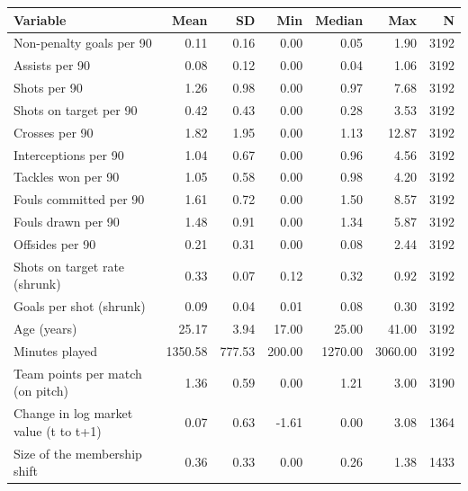 \begin{tabular}{lrrrrrr}
\toprule
Variable & Mean & SD & Min & Median & Max & N \\
\midrule
Non-penalty goals per 90 & 0.11 & 0.16 & 0.00 & 0.05 & 1.90 & 3192 \\
Assists per 90 & 0.08 & 0.12 & 0.00 & 0.04 & 1.06 & 3192 \\
Shots per 90 & 1.26 & 0.98 & 0.00 & 0.97 & 7.68 & 3192 \\
Shots on target per 90 & 0.42 & 0.43 & 0.00 & 0.28 & 3.53 & 3192 \\
Crosses per 90 & 1.82 & 1.95 & 0.00 & 1.13 & 12.87 & 3192 \\
Interceptions per 90 & 1.04 & 0.67 & 0.00 & 0.96 & 4.56 & 3192 \\
Tackles won per 90 & 1.05 & 0.58 & 0.00 & 0.98 & 4.20 & 3192 \\
Fouls committed per 90 & 1.61 & 0.72 & 0.00 & 1.50 & 8.57 & 3192 \\
Fouls drawn per 90 & 1.48 & 0.91 & 0.00 & 1.34 & 5.87 & 3192 \\
Offsides per 90 & 0.21 & 0.31 & 0.00 & 0.08 & 2.44 & 3192 \\
Shots on target rate (shrunk) & 0.33 & 0.07 & 0.12 & 0.32 & 0.92 & 3192 \\
Goals per shot (shrunk) & 0.09 & 0.04 & 0.01 & 0.08 & 0.30 & 3192 \\
Age (years) & 25.17 & 3.94 & 17.00 & 25.00 & 41.00 & 3192 \\
Minutes played & 1350.58 & 777.53 & 200.00 & 1270.00 & 3060.00 & 3192 \\
Team points per match (on pitch) & 1.36 & 0.59 & 0.00 & 1.21 & 3.00 & 3190 \\
Change in log market value (t to t+1) & 0.07 & 0.63 & -1.61 & 0.00 & 3.08 & 1364 \\
Size of the membership shift & 0.36 & 0.33 & 0.00 & 0.26 & 1.38 & 1433 \\
\bottomrule
\end{tabular}
